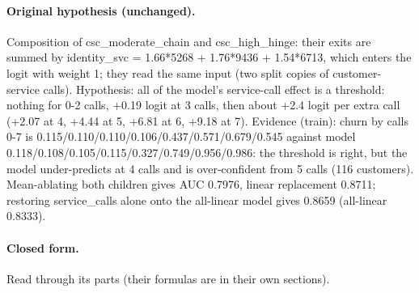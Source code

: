 \documentclass[a4paper,10pt]{article}
\newif\ifreviewmarks
\newcommand{\reviewrule}{\noindent{\color{BrickRed}\rule{\linewidth}{0.8pt}}}
\newenvironment{drafted}[1][]{%
  \ifreviewmarks\par\addvspace{\medskipamount}\reviewrule\par\nopagebreak
  \noindent{\color{BrickRed}\sffamily\footnotesize\textbf{Thesis Draft}\quad #1\hfill review}\par\nopagebreak\smallskip\fi}{%
  \ifreviewmarks\par\smallskip\noindent{\color{BrickRed}\sffamily\footnotesize end of thesis draft}\par\nopagebreak\reviewrule\par\medskip\fi}
\begin{document}
\begin{drafted}[plain-language layer: churn100-s4-c2]
\paragraph{Original hypothesis (unchanged).} Composition of csc\_\allowbreak{}moderate\_\allowbreak{}chain and csc\_\allowbreak{}high\_\allowbreak{}hinge: their exits are summed by identity\_\allowbreak{}svc = 1.66*5268 + 1.76*9436 + 1.54*6713, which enters the logit with weight 1; they read the same input (two split copies of customer-service calls). Hypothesis: all of the model's service-call effect is a threshold: nothing for 0-2 calls, +0.19 logit at 3 calls, then about +2.4 logit per extra call (+2.07 at 4, +4.44 at 5, +6.81 at 6, +9.18 at 7). Evidence (train): churn by calls 0-7 is 0.115/\allowbreak{}0.110/\allowbreak{}0.110/\allowbreak{}0.106/\allowbreak{}0.437/\allowbreak{}0.571/\allowbreak{}0.679/\allowbreak{}0.545 against model 0.118/\allowbreak{}0.108/\allowbreak{}0.105/\allowbreak{}0.115/\allowbreak{}0.327/\allowbreak{}0.749/\allowbreak{}0.956/\allowbreak{}0.986: the threshold is right, but the model under-predicts at 4 calls and is over-confident from 5 calls (116 customers). Mean-ablating both children gives AUC 0.7976, linear replacement 0.8711; restoring service\_\allowbreak{}calls alone onto the all-linear model gives 0.8659 (all-linear 0.8333).
\paragraph{Closed form.} Read through its parts (their formulas are in their own sections).

\end{drafted}
\end{document}
